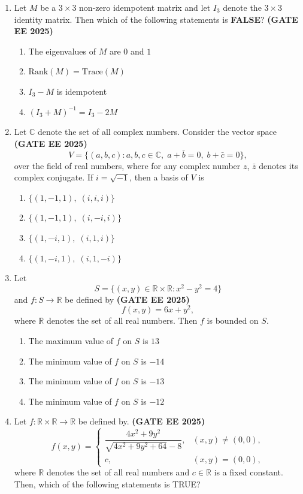 \documentclass[journal,12pt,onecolumn]{IEEEtran}
\theoremstyle{remark}
\begin{document}
\begin{enumerate}
\item Let $M$ be a $3 \times 3$ non-zero idempotent matrix and let $I_3$ denote the $3 \times 3$ identity matrix. Then which of the following statements is \textbf{FALSE}? \hfill \textbf{(GATE EE 2025)}
\begin{enumerate}
    \item The eigenvalues of $M$ are $0$ and $1$
    \item $\text{Rank}(M) = \text{Trace}(M)$
    \item $I_3 - M$ is idempotent
    \item $(I_3 + M)^{-1} = I_3 - 2M$
\end{enumerate}
\item Let $\mathbb{C}$ denote the set of all complex numbers. Consider the vector space \hfill \textbf{(GATE EE 2025)}
\[
V = \{(a,b,c) : a,b,c \in \mathbb{C}, \; a + \bar{b} = 0, \; b + \bar{c} = 0 \},
\]
over the field of real numbers, where for any complex number $z$, $\bar{z}$ denotes its complex conjugate. If $i = \sqrt{-1}$, then a basis of $V$ is
\begin{enumerate}
    \item $\{(1,-1,1), \; (i,i,i)\}$
    \item $\{(1,-1,1), \; (i,-i,i)\}$
    \item $\{(1,-i,1), \; (i,1,i)\}$
    \item $\{(1,-i,1), \; (i,1,-i)\}$
\end{enumerate}

\item Let 
\[
S = \{(x,y) \in \mathbb{R} \times \mathbb{R} : x^2 - y^2 = 4 \}
\]
and $f : S \to \mathbb{R}$ be defined by \hfill \textbf{(GATE EE 2025)}
\[
f(x,y) = 6x + y^2,
\]
where $\mathbb{R}$ denotes the set of all real numbers. Then $f$ is bounded on $S$.
\begin{enumerate} 
    \item The maximum value of $f$ on $S$ is $13$
    \item The minimum value of $f$ on $S$ is $-14$
    \item The minimum value of $f$ on $S$ is $-13$
    \item The minimum value of $f$ on $S$ is $-12$
\end{enumerate}

\item Let $f:\mathbb{R} \times \mathbb{R} \to \mathbb{R}$ be defined by. \hfill \textbf{(GATE EE 2025)}
\[
f(x,y) =
\begin{cases}
\dfrac{4x^{2} + 9y^{2}}{\sqrt{4x^{2} + 9y^{2} + 64} - 8}, & (x,y) \neq (0,0), \\[1em]
c, & (x,y) = (0,0),
\end{cases}
\]
where $\mathbb{R}$ denotes the set of all real numbers and $c \in \mathbb{R}$ is a fixed constant. Then, which of the following statements is TRUE?


\end{enumerate}
\end{document}
